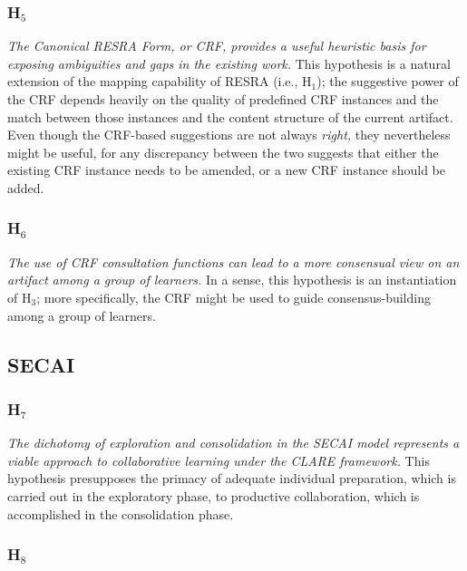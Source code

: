 \subsubsection{H\(_5\)}
\label{sec:RESRA5}

{\it The Canonical RESRA Form, or CRF, provides a useful heuristic basis
for exposing ambiguities and gaps in the existing work.} This hypothesis is
a natural extension of the mapping capability of RESRA (i.e., {\sf
H\(_1\)}); the suggestive power of the CRF depends heavily on the quality
of predefined CRF instances and the match between those instances and the
content structure of the current artifact.  Even though the CRF-based
suggestions are not always {\it right,\/} they nevertheless might be useful,
for any discrepancy between the two suggests that either the existing CRF
instance needs to be amended, or a new CRF instance should be added.


\subsubsection{H\(_6\)}
\label{sec:RESRA6}

{\it The use of CRF consultation functions can lead to a more consensual
view on an artifact among a group of learners.} In a sense, this hypothesis
is an instantiation of {\sf H\(_3\)\/}; more specifically, the CRF might be
used to guide consensus-building among a group of learners.


\subsection{SECAI}
\label{sec:SECAI hypothesis}

\subsubsection{H\(_7\)}
\label{sec:SM1}

{\it The dichotomy of exploration and consolidation in the SECAI model
represents a viable approach to collaborative learning under the CLARE
framework.} This hypothesis presupposes the primacy of adequate individual
preparation, which is carried out in the exploratory phase, to productive
collaboration, which is accomplished in the consolidation phase.


\subsubsection{H\(_8\)}
\label{sec:SM2}

